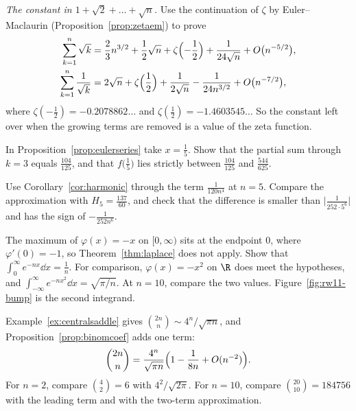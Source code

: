 \begin{exercise}[$\star\star$]\label{pb:sqrtsum}
\emph{The constant in $1+\sqrt2+\dots+\sqrt n$.} Use the continuation of $\zeta$ by Euler--Maclaurin (Proposition~\ref{prop:zetaem}) to prove
\[
\begin{aligned}\sum_{k=1}^n\sqrt k&=\frac23n^{3/2}+\frac12\sqrt n+\zeta\Bigl(-\frac12\Bigr)+\frac1{24\sqrt n}+O\bigl(n^{-5/2}\bigr),\\
\sum_{k=1}^n\frac1{\sqrt k}&=2\sqrt n+\zeta\Bigl(\frac12\Bigr)+\frac1{2\sqrt n}-\frac1{24n^{3/2}}+O\bigl(n^{-7/2}\bigr),\end{aligned}
\]
where $\zeta(-\frac12)=-0.2078862\ldots$ and $\zeta(\frac12)=-1.4603545\ldots$ So the constant left over when the growing terms are removed is a value of the zeta function.
\end{exercise}

\begin{exercise}[$\star$]\label{ex:rw11a}
In Proposition~\ref{prop:eulerseries} take $x=\frac15$. Show that the partial sum through $k=3$ equals $\frac{104}{125}$, and that $f\bigl(\frac15\bigr)$ lies strictly between $\frac{104}{125}$ and $\frac{544}{625}$.
\end{exercise}

\begin{exercise}[$\star\star$]\label{ex:rw11b}
Use Corollary~\ref{cor:harmonic} through the term $\frac1{120n^4}$ at $n=5$. Compare the approximation with $H_5=\frac{137}{60}$, and check that the difference is smaller than $\bigl|\frac1{252\cdot5^6}\bigr|$ and has the sign of $-\frac1{252n^6}$.
\end{exercise}

\begin{exercise}[$\star\star$]\label{ex:rw11c}
The maximum of $\varphi(x)=-x$ on $[0,\infty)$ sits at the endpoint $0$, where $\varphi'(0)=-1$, so Theorem~\ref{thm:laplace} does not apply. Show that $\int_0^\infty e^{-nx}\dd x=\frac1n$. For comparison, $\varphi(x)=-x^2$ on $\R$ does meet the hypotheses, and $\int_{-\infty}^\infty e^{-nx^2}\dd x=\sqrt{\pi/n}$. At $n=10$, compare the two values. Figure~\ref{fig:rw11-bump} is the second integrand.
\end{exercise}

\begin{exercise}[$\star\star\star$]\label{ex:rw11d}
Example~\ref{ex:centralsaddle} gives $\binom{2n}{n}\sim 4^n/\sqrt{\pi n}$, and Proposition~\ref{prop:binomcoef} adds one term:
\[
\binom{2n}{n}=\frac{4^n}{\sqrt{\pi n}}\Bigl(1-\frac1{8n}+O(n^{-2})\Bigr).
\]
For $n=2$, compare $\binom42=6$ with $4^2/\sqrt{2\pi}$. For $n=10$, compare $\binom{20}{10}=184756$ with the leading term and with the two-term approximation.
\end{exercise}

